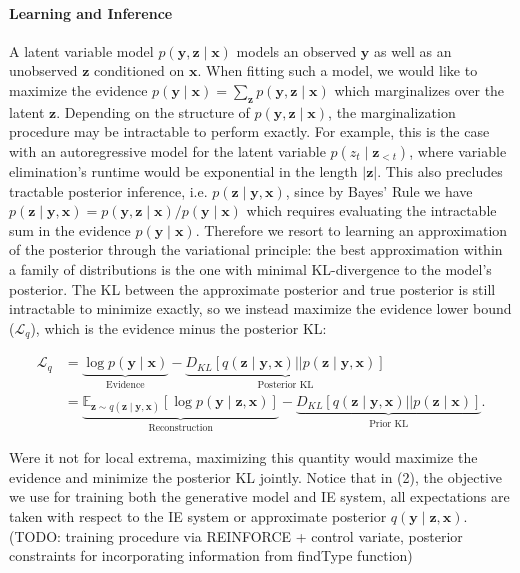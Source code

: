 \documentclass[11pt]{article}
\newcommand\Es[2]{\mathbb{E}_{#1}\left[#2\right]}
\newcommand{\bx}{\mathbf{x}}
\newcommand{\by}{\mathbf{y}}
\newcommand{\bz}{\mathbf{z}}
\begin{document}
\paragraph{Learning and Inference}
\begin{comment}
\item Question: Do I need to motivate approximate inference?
I could also argue that rather than computing the posterior exactly,
at test time using the approximation directly can be more efficient,
especially if it is fully factored
\item Need to figure out if this is the right place for this
\item Describe how to incorporate the weak supervision through posterior constraints
\end{comment}
A latent variable model $p(\by,\bz\mid\bx)$ models an
observed $\by$ as well as an unobserved $\bz$ conditioned on $\bx$.
When fitting such a model, we would like to maximize the evidence
$p(\by\mid\bx)=\sum_\bz p(\by,\bz\mid\bx)$ which marginalizes over
the latent $\bz$.
Depending on the structure of $p(\by,\bz\mid\bx)$,
the marginalization procedure may be intractable to perform exactly.
For example, this is the case with an autoregressive model for the latent
variable $p(z_t\mid \bz_{<t})$, where variable elimination's runtime would be
exponential in the length $|\bz|$.
This also precludes tractable posterior inference, i.e. $p(\bz\mid\by,\bx)$,
since by Bayes' Rule we have $p(\bz\mid\by,\bx)=p(\by,\bz\mid\bx)/p(\by\mid\bx)$
which requires evaluating the intractable sum in the evidence $p(\by\mid\bx)$.
Therefore we resort to learning an approximation of the posterior through the variational principle:
the best approximation within a family of distributions is the one with minimal KL-divergence
to the model's posterior.
The KL between the approximate posterior and true posterior is still intractable to minimize exactly,
so we instead maximize the evidence lower bound ($\mathcal{L}_q$), which is the evidence minus the posterior KL:
\begin{linenomath*}
\begin{align}
\mathcal{L}_q
&= \underbrace{\log p(\by\mid\bx)}_{\textrm{Evidence}}
- \underbrace{D_{KL}[q(\bz\mid\by,\bx)||p(\bz\mid\by,\bx)]}_{\textrm{Posterior KL}}\\
&= \underbrace{\Es{\bz\sim q(\bz\mid\by,\bx)}{\log p(\by\mid\bz,\bx)}}_{\textrm{Reconstruction}}
- \underbrace{D_{KL}[q(\bz\mid\by,\bx) || p(\bz\mid\bx)]}_{\textrm{Prior KL}}.
\end{align}
\end{linenomath*}
Were it not for local extrema,
maximizing this quantity would maximize the evidence and minimize the posterior KL jointly.
Notice that in (2), the objective we use for training both the generative model and IE system,
all expectations are taken with respect to the IE system or approximate posterior $q(\by\mid\bz,\bx)$.
(TODO: training procedure via REINFORCE + control variate, posterior constraints for incorporating 
information from findType function)
\end{document}
